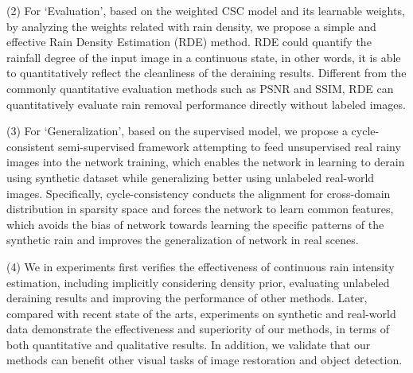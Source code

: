 \begin{enabstract}
(2) For `Evaluation', based on the weighted CSC model and its learnable weights, by analyzing the weights related with rain density, we propose a simple and effective Rain Density Estimation (RDE) method. RDE could quantify the rainfall degree of the input image in a continuous state, in other words, it is able to quantitatively reflect the cleanliness of the deraining results. Different from the commonly quantitative evaluation methods such as PSNR and SSIM, RDE can quantitatively evaluate rain removal performance directly without labeled images.

(3) For `Generalization', based on the supervised model, we propose a cycle-consistent semi-supervised framework attempting to feed unsupervised real rainy images into the network training, which enables the network in learning to derain using synthetic dataset while generalizing better using unlabeled real-world images. Specifically, cycle-consistency conducts the alignment for cross-domain distribution in sparsity space and forces the network to learn common features, which avoids the bias of network towards learning the specific patterns of the synthetic rain and improves the generalization of network in real scenes. 


(4) We in experiments first verifies the effectiveness of continuous rain intensity estimation, including implicitly considering density prior, evaluating unlabeled deraining results and improving the performance of other methods. Later, compared with recent state of the arts, experiments on synthetic and real-world data demonstrate the effectiveness and superiority of our methods, in terms of both quantitative and qualitative results. In addition, we validate that our methods can benefit other visual tasks of  image restoration and object detection.
 
\end{enabstract}

\begin{center}{\songti{}  \par}\end{center}

\noindent{}


